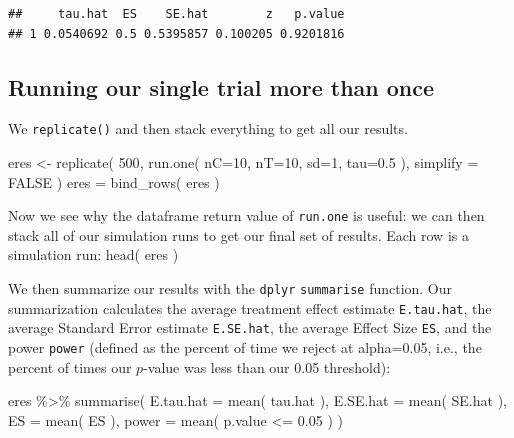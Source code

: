 \documentclass[
]{book}
\newenvironment{Shaded}{\begin{snugshade}}{\end{snugshade}}
\newcommand{\AttributeTok}[1]{\textcolor[rgb]{0.77,0.63,0.00}{#1}}
\newcommand{\ConstantTok}[1]{\textcolor[rgb]{0.00,0.00,0.00}{#1}}
\newcommand{\DecValTok}[1]{\textcolor[rgb]{0.00,0.00,0.81}{#1}}
\newcommand{\FloatTok}[1]{\textcolor[rgb]{0.00,0.00,0.81}{#1}}
\newcommand{\FunctionTok}[1]{\textcolor[rgb]{0.00,0.00,0.00}{#1}}
\newcommand{\NormalTok}[1]{#1}
\newcommand{\OtherTok}[1]{\textcolor[rgb]{0.56,0.35,0.01}{#1}}
\newcommand{\SpecialCharTok}[1]{\textcolor[rgb]{0.00,0.00,0.00}{#1}}
\begin{document}
\begin{verbatim}
##     tau.hat  ES    SE.hat        z   p.value
## 1 0.0540692 0.5 0.5395857 0.100205 0.9201816
\end{verbatim}

\hypertarget{running-our-single-trial-more-than-once}{%
\subsection{Running our single trial more than once}\label{running-our-single-trial-more-than-once}}

We \texttt{replicate()} and then stack everything to get all our results.

\begin{Shaded}
\begin{Highlighting}[]
\NormalTok{eres }\OtherTok{\textless{}{-}} \FunctionTok{replicate}\NormalTok{( }\DecValTok{500}\NormalTok{, }\FunctionTok{run.one}\NormalTok{( }\AttributeTok{nC=}\DecValTok{10}\NormalTok{, }\AttributeTok{nT=}\DecValTok{10}\NormalTok{, }\AttributeTok{sd=}\DecValTok{1}\NormalTok{, }\AttributeTok{tau=}\FloatTok{0.5}\NormalTok{ ), }\AttributeTok{simplify =} \ConstantTok{FALSE}\NormalTok{ )}
\NormalTok{eres }\OtherTok{=} \FunctionTok{bind\_rows}\NormalTok{( eres )}
\end{Highlighting}
\end{Shaded}

Now we see why the dataframe return value of \texttt{run.one} is useful: we can then
stack all of our simulation runs to get our final set of results.
Each row is a simulation run:
head( eres )

We then summarize our results with the \texttt{dplyr} \texttt{summarise} function. Our
summarization calculates the average treatment effect estimate \texttt{E.tau.hat},
the average Standard Error estimate \texttt{E.SE.hat}, the average Effect Size \texttt{ES},
and the power \texttt{power} (defined as the percent of time we reject at
alpha=0.05, i.e., the percent of times our \(p\)-value was less than our 0.05
threshold):

\begin{Shaded}
\begin{Highlighting}[]
\NormalTok{eres }\SpecialCharTok{\%\textgreater{}\%} \FunctionTok{summarise}\NormalTok{( }\AttributeTok{E.tau.hat =} \FunctionTok{mean}\NormalTok{( tau.hat ),}
                    \AttributeTok{E.SE.hat =} \FunctionTok{mean}\NormalTok{( SE.hat ),}
                    \AttributeTok{ES =} \FunctionTok{mean}\NormalTok{( ES ),}
                    \AttributeTok{power =} \FunctionTok{mean}\NormalTok{( p.value }\SpecialCharTok{\textless{}=} \FloatTok{0.05}\NormalTok{ ) )}
\end{Highlighting}
\end{Shaded}
\end{document}
